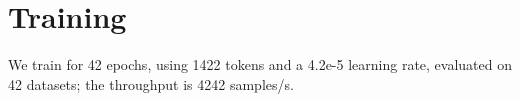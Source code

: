 \section{Training}
We train for 42 epochs, using 1422 tokens and a 4.2e-5 learning rate,
evaluated on 42 datasets; the throughput is 4242 samples/s.
